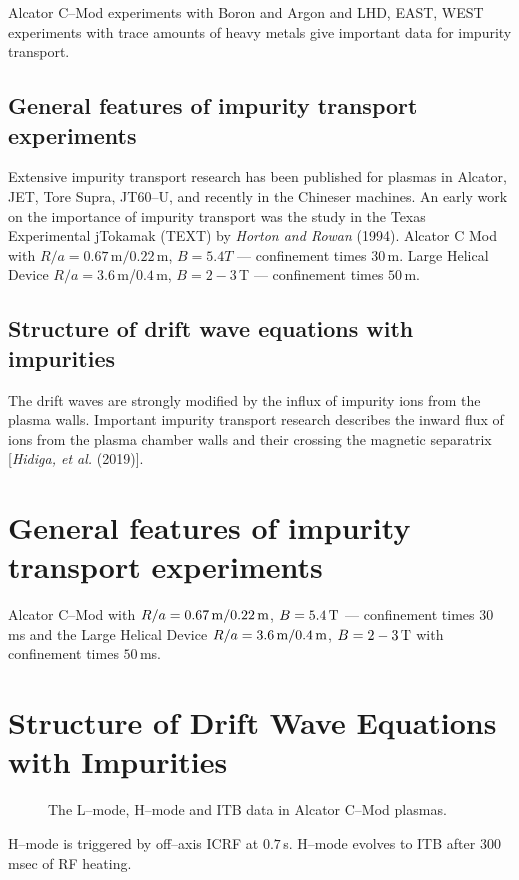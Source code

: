\documentclass[a4paper,openany,12pt]{book}
\begin{document}


Alcator C--Mod experiments with Boron and Argon and LHD, EAST, WEST experiments with trace amounts of heavy metals give important data for impurity transport.

\subsection{General features of impurity transport experiments}

Extensive impurity transport research has been published for plasmas in Alcator, JET, Tore Supra, JT60--U, and recently in the Chineser machines. An early work on the importance of impurity transport was the study in the Texas Experimental jTokamak (TEXT) by \emph{Horton and Rowan} (1994). 
Alcator C Mod with $R/a=0.67\,\mathrm{m}/0.22\,$m, $B=5.4T$ --- confinement times $30\,$m. 
Large Helical Device $R/a=3.6\,$m/$0.4\,$m, $B=2-3\,$T --- confinement times $50\,$m.

\subsection{Structure of drift wave equations with impurities}

The drift waves are strongly modified by the influx of impurity ions from the plasma walls. Important impurity transport research describes the inward flux of ions from the plasma chamber walls and their crossing the magnetic separatrix [\emph{Hidiga, et al.} (2019)].

\section{General features of impurity transport experiments}

Alcator C--Mod with $R/a=0.67\,\rm m/0.22\,\rm m$, $B=5.4\,\rm T$ --- confinement times 
$30\,$ms and the Large Helical Device $R/a=3.6\,\rm m/0.4\,\rm m$, $B=2-3\,\rm T$ with confinement times $50\,$ms.

\section{Structure of Drift Wave Equations with Impurities}
%
\begin{figure}[H]
\centerline{}
\caption{The L--mode, H--mode and ITB data in Alcator C--Mod plasmas.}
\label{F9.22}
\end{figure}
%
H--mode is triggered by off--axis ICRF at $0.7\,$s. H--mode evolves to ITB after $300\,$msec of RF heating.
\end{document}
